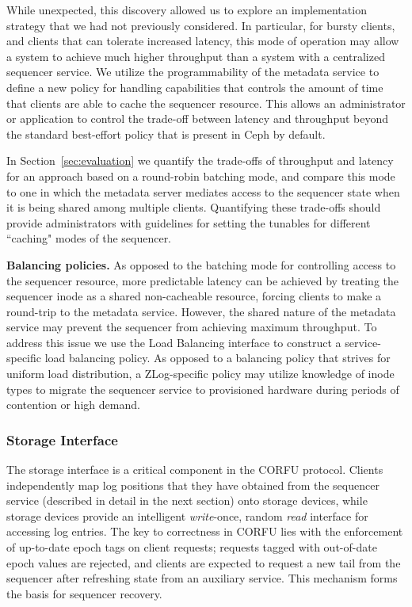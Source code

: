 While unexpected, this discovery allowed us to explore an implementation
strategy that we had not previously considered. In particular, for bursty
clients, and clients that can tolerate increased latency, this mode of
operation may allow a system to achieve much higher throughput than a system
with a centralized sequencer service.  We utilize the programmability of the
metadata service to define a new policy for handling capabilities that controls
the amount of time that clients are able to cache the sequencer resource. This
allows an administrator or application to control the trade-off between latency
and throughput beyond the standard best-effort policy that is present in Ceph
by default. 

In Section~\ref{sec:evaluation} we quantify the trade-offs of throughput and
latency for an approach based on a round-robin batching mode, and compare this
mode to one in which the metadata server mediates access to the sequencer state
when it is being shared among multiple clients. Quantifying these trade-offs
should provide administrators with guidelines for setting the tunables for
different ``caching" modes of the sequencer.

{\bf Balancing policies.} As opposed to the batching mode for controlling
access to the sequencer resource, more predictable latency can be achieved by
treating the sequencer inode as a shared non-cacheable resource, forcing
clients to make a round-trip to the metadata service. However, the shared
nature of the metadata service may prevent the sequencer from achieving maximum
throughput. To address this issue we use the Load Balancing interface to
construct a service-specific load balancing policy. As opposed to a balancing
policy that strives for uniform load distribution, a ZLog-specific policy may
utilize knowledge of inode types to migrate the sequencer service to
provisioned hardware during periods of contention or high demand.

\subsubsection{Storage Interface}

The storage interface is a critical component in the CORFU protocol. Clients
independently map log positions that they have obtained from the sequencer
service (described in detail in the next section) onto storage devices, while
storage devices provide an intelligent \emph{write}-once, random \emph{read}
interface for accessing log entries. The key to correctness in CORFU lies with
the enforcement of up-to-date epoch tags on client requests; requests tagged
with out-of-date epoch values are rejected, and clients are expected to request
a new tail from the sequencer after refreshing state from an auxiliary service.
This mechanism forms the basis for sequencer recovery.

